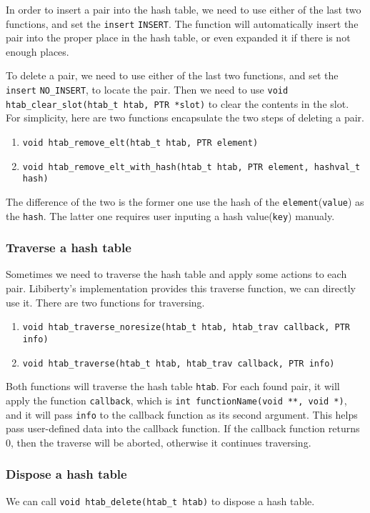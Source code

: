 \documentclass[11pt]{article}
\begin{document}
In order to insert a pair into the hash table, we need to use either of the last two functions, and set the \texttt{insert} \texttt{INSERT}. The function will automatically insert the pair into the proper place in the hash table, or even expanded it if there is not enough places.

To delete a pair, we need to use either of the last two functions, and set the \texttt{insert} \texttt{NO\_INSERT}, to locate the pair. Then we need to use \texttt{void htab\_clear\_slot(htab\_t htab, PTR *slot)} to clear the contents in the slot.
For simplicity, here are two functions encapsulate the two steps of deleting a pair.
\begin{enumerate}
\item \texttt{void htab\_remove\_elt(htab\_t htab, PTR element)}
\item \texttt{void htab\_remove\_elt\_with\_hash(htab\_t htab, PTR element, hashval\_t hash)}
\end{enumerate}
The difference of the two is the former one use the hash of the \texttt{element}(\texttt{value}) as the \texttt{hash}. The latter one requires user inputing a hash value(\texttt{key}) manualy.
\subsubsection{Traverse a hash table}
Sometimes we need to traverse the hash table and apply some actions to each pair. Libiberty's implementation provides this traverse function, we can directly use it. There are two functions for traversing.
\begin{enumerate}
\item \texttt{void htab\_traverse\_noresize(htab\_t htab, htab\_trav callback, PTR info)}
\item \texttt{void htab\_traverse(htab\_t htab, htab\_trav callback, PTR info)}
\end{enumerate}

Both functions will traverse the hash table \texttt{htab}. For each found pair, it will apply the function \texttt{callback}, which is \texttt{int functionName(void **, void *)}, and it will pass \texttt{info} to the callback function as its second argument. This helps pass user-defined data into the callback function. If the callback function returns 0, then the traverse will be aborted, otherwise it continues traversing.

\subsubsection{Dispose a hash table}
We can call \texttt{void htab\_delete(htab\_t htab)} to dispose a hash table.
\end{document}
